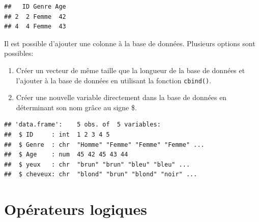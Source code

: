 \documentclass[
]{book}
\newenvironment{Shaded}{\begin{snugshade}}{\end{snugshade}}
\newcommand{\FunctionTok}[1]{\textcolor[rgb]{0.13,0.29,0.53}{\textbf{#1}}}
\newcommand{\NormalTok}[1]{#1}
\newcommand{\OtherTok}[1]{\textcolor[rgb]{0.56,0.35,0.01}{#1}}
\newcommand{\SpecialCharTok}[1]{\textcolor[rgb]{0.81,0.36,0.00}{\textbf{#1}}}
\newcommand{\StringTok}[1]{\textcolor[rgb]{0.31,0.60,0.02}{#1}}
\providecommand{\tightlist}{%
  \setlength{\itemsep}{0pt}\setlength{\parskip}{0pt}}
\begin{document}
\begin{verbatim}
##   ID Genre Age
## 2  2 Femme  42
## 4  4 Femme  43
\end{verbatim}

Il est possible d'ajouter une colonne à la base de données. Plusieurs options sont possibles:

\begin{enumerate}
\def\labelenumi{\arabic{enumi}.}
\tightlist
\item
  Créer un vecteur de même taille que la longueur de la base de données et l'ajouter à la base de données en utilisant la fonction \texttt{cbind()}.
\item
  Créer une nouvelle variable directement dans la base de données en déterminant son nom grâce au signe \$.
\end{enumerate}

\begin{Shaded}
\end{Shaded}

\begin{verbatim}
## 'data.frame':    5 obs. of  5 variables:
##  $ ID     : int  1 2 3 4 5
##  $ Genre  : chr  "Homme" "Femme" "Femme" "Femme" ...
##  $ Age    : num  45 42 45 43 44
##  $ yeux   : chr  "brun" "brun" "bleu" "bleu" ...
##  $ cheveux: chr  "blond" "brun" "blond" "noir" ...
\end{verbatim}

\section{Opérateurs logiques}\label{opuxe9rateurs-logiques}
\end{document}
